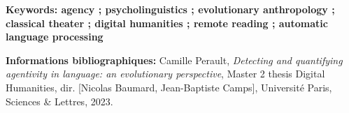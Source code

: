 \medskip

\textbf{Keywords: agency ; psycholinguistics ; evolutionary anthropology ; classical theater ; digital humanities ; remote reading ; automatic language processing}

\textbf{Informations bibliographiques:} Camille Perault, \textit{Detecting and quantifying agentivity in language: an evolutionary perspective}, Master 2 thesis \og Digital Humanities\fg{}, dir. [Nicolas Baumard, Jean-Baptiste Camps], Université Paris, Sciences \& Lettres, 2023.


\clearpage